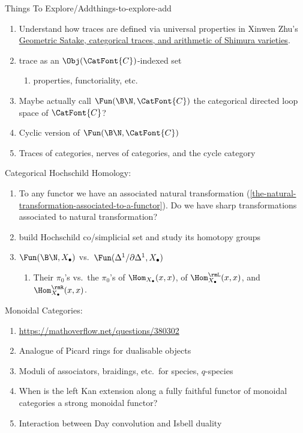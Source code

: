 \begin{remark}{Things To Explore/Add}{things-to-explore-add}
\begin{enumerate}
        \item Understand how traces are defined via universal properties in Xinwen Zhu's \href{https://arxiv.org/abs/1810.07375}{Geometric Satake, categorical traces, and arithmetic of Shimura varieties}.
        \item trace as an $\Obj(\CatFont{C})$-indexed set
            \begin{enumerate}
                \item properties, functoriality, etc.
            \end{enumerate}
        \item Maybe actually call $\Fun(\B\N,\CatFont{C})$ the categorical directed loop space of $\CatFont{C}$?
        \item Cyclic version of $\Fun(\B\N,\CatFont{C})$
        \item Traces of categories, nerves of categories, and the cycle category
    \end{enumerate}
    Categorical Hochschild Homology:
    \begin{enumerate}
        \item To any functor we have an associated natural transformation (\cref{the-natural-transformation-associated-to-a-functor}). Do we have sharp transformations associated to natural transformation?
        \item build Hochschild co/simplicial set and study its homotopy groups
        \item $\Fun(\B\N,X_{\bullet})$ vs.\ $\Fun(\Delta^{1}/\partial\Delta^{1},X_{\bullet})$
            \begin{enumerate}
                \item Their $\pi_{0}$'s vs.\ the $\pi_{0}$'s of $\Hom_{X_{\bullet}}(x,x)$, of $\Hom^{\rmL}_{X_{\bullet}}(x,x)$, and $\Hom^{\rmR}_{X_{\bullet}}(x,x)$.
            \end{enumerate}
    \end{enumerate}
    Monoidal Categories:
    \begin{enumerate}
        \item \url{https://mathoverflow.net/questions/380302}
        \item Analogue of Picard rings for dualisable objects
        \item Moduli of associators, braidings, etc.\ for species, $q$-species
        \item When is the left Kan extension along a fully faithful functor of monoidal categories a strong monoidal functor?
        \item Interaction between Day convolution and Isbell duality

\end{enumerate}
\end{remark}
